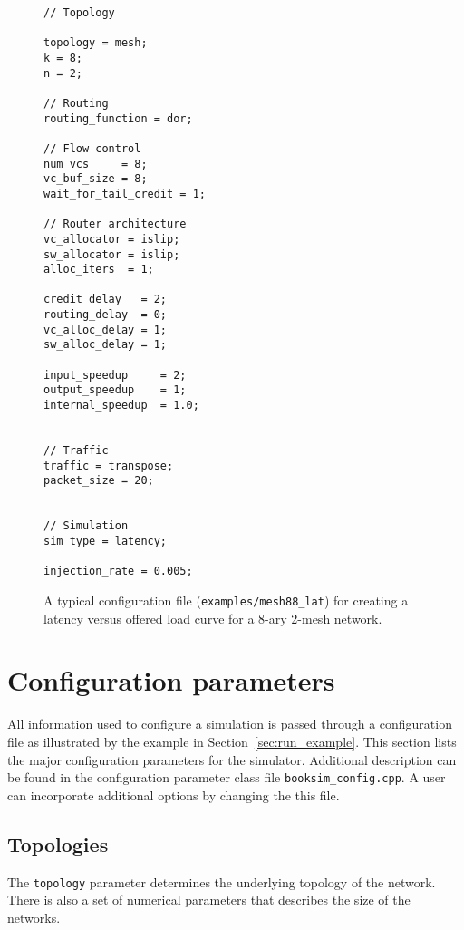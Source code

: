 \documentclass[11pt]{article}
\begin{document}
\begin{figure}
\begin{verbatim}
// Topology

topology = mesh;
k = 8;
n = 2;

// Routing
routing_function = dor;

// Flow control
num_vcs     = 8;
vc_buf_size = 8;
wait_for_tail_credit = 1;

// Router architecture
vc_allocator = islip;
sw_allocator = islip;
alloc_iters  = 1;

credit_delay   = 2;
routing_delay  = 0;
vc_alloc_delay = 1;
sw_alloc_delay = 1;

input_speedup     = 2;
output_speedup    = 1;
internal_speedup  = 1.0;


// Traffic
traffic = transpose;
packet_size = 20;


// Simulation
sim_type = latency;

injection_rate = 0.005;

\end{verbatim}
\caption{A typical configuration file (\texttt{examples/mesh88\_lat})
for creating a latency versus offered load curve for a 8-ary 2-mesh
network.}
\label{fig:lat_vs_load}
\end{figure}

\section{Configuration parameters}
\label{sec:config_params}

All information used to configure a simulation is passed through a
configuration file as illustrated by the example in 
Section~\ref{sec:run_example}.  This section lists the major
configuration parameters for the simulator. Additional description can be found in the 
configuration parameter class file \texttt{booksim\_config.cpp}.
A user can incorporate additional options by changing the this file.

\subsection{Topologies}
\label{sec:topos}

The \texttt{topology} parameter determines the underlying topology of
the network. There is also a set of numerical parameters that
describes the size of the networks.  
\end{document}
